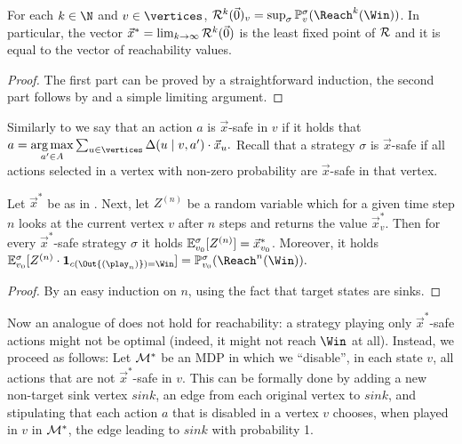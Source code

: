 \begin{lemma}
\label{5-lem:quant-reach-step-operator}
For each $k\in \N$ and $v\in \vertices$, $\ReachOp^k(\vec{0})_v = \sup_{\sigma}\probm^\sigma_v(\Reach^k(\Win))$. In particular, the vector $\vec{x}^* = \lim_{k \rightarrow\infty} \mathcal{R}^k(\vec{0})$ is the least fixed point of $ \mathcal{R} $ and it is equal to the vector of reachability values. 
\end{lemma}
\begin{proof}
The first part can be proved by a straightforward induction, the second part follows by  and a simple limiting argument.
\end{proof}




Similarly to  we say that an action $a$ is $\vec{x}$-safe in $v$ if it holds that $a= \underset{a' \in \actions}{\arg\max} \sum_{u\in \vertices} 
\probTranFunc(u\mid v,a') \cdot\vec{x}_u.$ Recall that a strategy $\sigma$ is $\vec{x}$-safe if all actions selected in a vertex with non-zero probability are $\vec{x}$-safe in that vertex. 

\begin{lemma}
\label{5-lem:quant-reach-value-distribution}
Let $ \vec{x}^* $ be as in . 
Next, let $Z^{(n)}$ be a random variable which for a given time step $n$ looks at the current vertex $v$ after $n$ steps and returns the value $\vec{x}^*_v$. Then for every $\vec{x}^*$-safe strategy $\sigma$ it holds $\mathbb{E}^\sigma_{v_0}[Z^{(n)}] = \vec{x}^*_{v_0}$. Moreover, it holds $\expv^\sigma_{\vinit}[Z^{(n)}\cdot \indicator{\colouring{(\Out{(\play_{n})})}=\Win}] = \probm^\sigma_{\vinit}(\Reach^n(\Win)).$
\end{lemma}
\begin{proof}
By an easy induction on $n$, using the fact that target states are  sinks.
\end{proof}



Now an analogue of  does not hold for reachability: a strategy playing only $\vec{x}^*$-safe actions might not be optimal (indeed, it might not reach $\Win$ at all). Instead, we proceed as follows: Let $\mathcal{M}^*$ be an MDP in which we ``disable'', in each state $v$, all actions that are not $\vec{x}^*$-safe in $v$. This can be formally done by adding a new non-target sink vertex $ \mathit{sink} $, an edge from each original vertex to $ \mathit{sink} $, and stipulating that each action $a$ that is disabled in a vertex $ v $ chooses, when played in $ v $ in $ \mathcal{M}^*$, the edge leading to $ \mathit{sink} $ with probability 1. 

